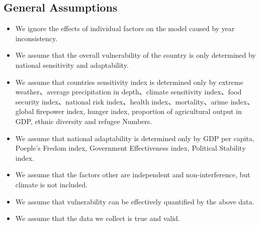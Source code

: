 \documentclass{mcmthesis}
\begin{document}
\subsection{General Assumptions}
\begin{itemize}
  \item We ignore the effects of individual factors on the model caused by year inconsistency.
  \item We assume that the overall vulnerability of the country is only determined by national sensitivity and adaptability.
  \item We assume that countries sensitivity index is determined only by extreme weather、average precipitation in depth、climate sensitivity index、food security index、national risk index、health index、mortality、arime index、global firepower index, hunger index,  proportion of agricultural output in GDP, ethnic diversity and refugee Numbers.
  \item We assume that national adaptability is determined only by GDP per capita, Poeple's Fredom index, Government Effectiveness index, Political Stability index.
  \item We assume that the factors other are independent and non-interference, but climate is not included.
  \item We assume that vulnerability can be effectively quantified by the above data.
  \item We assume that the data we collect is true and valid.
\end{itemize}
\end{document}
